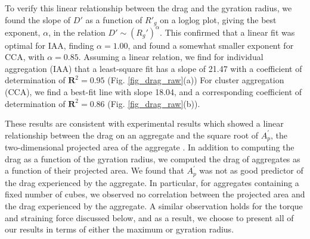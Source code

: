 To verify this linear relationship between the drag and the gyration radius, we found the slope of $D'$ as a function of $R'_g$ on a loglog plot, giving the best exponent, $\alpha$, in the relation $D' \sim (R_g')^\alpha$. This confirmed that a linear fit was optimal for IAA, finding $\alpha=1.00$, and found a somewhat smaller exponent for CCA, with $\alpha=0.85$. Assuming a linear relation, we find
for individual aggregation (IAA) that a least-square fit has a slope of 21.47 with  a coefficient of determination of $\mathbf{R}^2=0.95$ (Fig. \ref{fig_drag_raw}(a)) 
For cluster aggregation (CCA), we find a best-fit line with slope 18.04, and a corresponding coefficient of determination of $\mathbf{R}^2=0.86$ (Fig. \ref{fig_drag_raw}(b)). 



These results are consistent with experimental results which showed a linear relationship between the drag on an aggregate and the square root of $A^\prime_p$, the two-dimensional projected area of the aggregate \cite{tang_model_2002}.  In addition to computing the drag as a function of the gyration radius, we computed the drag of aggregates as a function of their projected area. We found that $A^\prime_p$ was not as good predictor of the drag experienced by the aggregate. In particular, for aggregates containing a fixed number of cubes, we observed no correlation between the projected area and the drag experienced by the aggregate. A similar observation holds for the torque and straining force discussed below, and as a result, we choose to present all of our results in terms of either the maximum or gyration radius.

